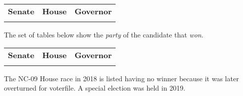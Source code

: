\documentclass[12pt]{article}
\begin{document}
\begin{itemize}[leftmargin=*]
\begin{tabularx}{\linewidth}{CCC}
    \textbf{Senate} & \textbf{House} & \textbf{Governor}\\
     &  & 
    \end{tabularx}


The set of tables below show the \emph{party} of the candidate that \emph{won}. 

    \begin{tabularx}{\linewidth}{CCC}
    \textbf{Senate} & \textbf{House} & \textbf{Governor}\\
     &  & 
    \end{tabularx}

The NC-09 House race in 2018 is listed having no winner because it was later overturned for voterfile. A special election was held in 2019.

\end{itemize}
	
\end{document}
